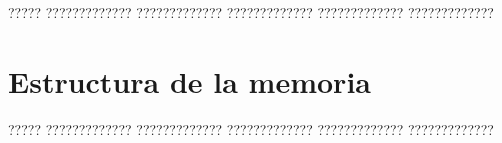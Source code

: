 ????? ????????????? ????????????? ????????????? ????????????? ?????????????

\section{Estructura de la memoria}

????? ????????????? ????????????? ????????????? ????????????? ?????????????


